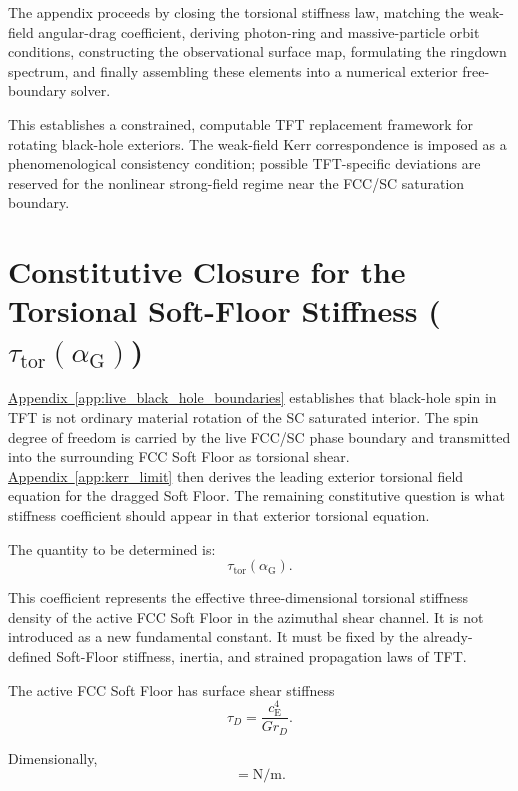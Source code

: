 The appendix proceeds by closing the torsional stiffness law, matching the weak-field angular-drag coefficient, deriving photon-ring and massive-particle orbit conditions, constructing the observational surface map, formulating the ringdown spectrum, and finally assembling these elements into a numerical exterior free-boundary solver.

This establishes a constrained, computable TFT replacement framework for rotating black-hole exteriors. The weak-field Kerr correspondence is imposed as a phenomenological consistency condition; possible TFT-specific deviations are reserved for the nonlinear strong-field regime near the FCC/SC saturation boundary.

\section{Constitutive Closure for the Torsional Soft-Floor Stiffness ($\tau_{\mathrm{tor}}(\alpha_{\mathrm{G}})$)}

\hyperref[app:live_black_hole_boundaries]{Appendix~\ref*{app:live_black_hole_boundaries}} establishes that black-hole spin in TFT is not ordinary material rotation of the SC saturated interior. The spin degree of freedom is carried by the live FCC/SC phase boundary and transmitted into the surrounding FCC Soft Floor as torsional shear. \hyperref[app:kerr_limit]{Appendix~\ref*{app:kerr_limit}} then derives the leading exterior torsional field equation for the dragged Soft Floor. The remaining constitutive question is what stiffness coefficient should appear in that exterior torsional equation.

The quantity to be determined is:
\begin{equation}
    \tau_{\mathrm{tor}}(\alpha_{\mathrm{G}}).
\end{equation}

This coefficient represents the effective three-dimensional torsional stiffness density of the active FCC Soft Floor in the azimuthal shear channel. It is not introduced as a new fundamental constant. It must be fixed by the already-defined Soft-Floor stiffness, inertia, and strained propagation laws of TFT.

The active FCC Soft Floor has surface shear stiffness
\begin{equation}
    \tau_D = \frac{c_{\mathrm{E}}^4}{G r_D}.
\end{equation}

Dimensionally,
\begin{equation}
    [\tau_D] = \mathrm{N/m}.
\end{equation}

